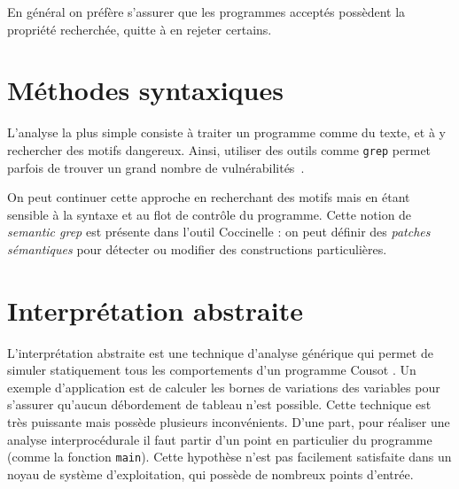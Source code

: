En général on préfère s'assurer que les programmes acceptés possèdent la
propriété recherchée, quitte à en rejeter certains.

\section{Méthodes syntaxiques}

L'analyse la plus simple consiste à traiter un programme comme du texte, et à y
rechercher des motifs dangereux. Ainsi, utiliser des outils comme \texttt{grep}
permet parfois de trouver un grand nombre de vulnérabilités~\cite{SpenderGrep}.

On peut continuer cette approche en recherchant des motifs mais en étant
sensible à la syntaxe et au flot de contrôle du programme. Cette notion de
\emph{semantic grep} est présente dans l'outil Coccinelle
\cite{coccinelle09,coccinelle11}  : on peut définir des
\emph{patches sémantiques} pour détecter ou modifier des constructions
particulières.

\section{Interprétation abstraite}

L'interprétation abstraite est une technique d'analyse générique qui permet de
simuler statiquement tous les comportements d'un programme Cousot
\cite{Cousot77,Cousot92-1}. Un exemple d'application est de calculer les bornes
de variations des variables pour s'assurer qu'aucun débordement de tableau n'est
possible. Cette technique est très puissante mais possède plusieurs
inconvénients. D'une part, pour réaliser une analyse interprocédurale il faut
partir d'un point en particulier du programme (comme la fonction \texttt{main}).
Cette hypothèse n'est pas facilement satisfaite dans un noyau de système
d'exploitation, qui possède de nombreux points d'entrée.


